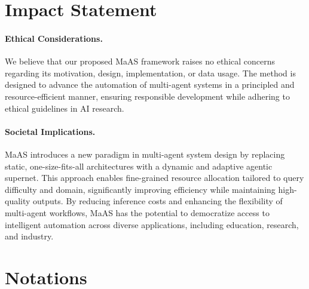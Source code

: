 \documentclass{article}
\theoremstyle{plain}
\theoremstyle{definition}
\theoremstyle{remark}
\newcommand{\ourmethod}{{{MaAS}}\xspace}
\begin{document}
\section*{Impact Statement}  

\paragraph{Ethical Considerations.}  
We believe that our proposed \ourmethod framework raises no ethical concerns regarding its motivation, design, implementation, or data usage. The method is designed to advance the automation of multi-agent systems in a principled and resource-efficient manner, ensuring responsible development while adhering to ethical guidelines in AI research.
\vspace{-0.5em}  
\paragraph{Societal Implications.}  
\ourmethod introduces a new paradigm in multi-agent system design by replacing static, one-size-fits-all architectures with a dynamic and adaptive agentic supernet. This approach enables fine-grained resource allocation tailored to query difficulty and domain, significantly improving efficiency while maintaining high-quality outputs. By reducing inference costs and enhancing the flexibility of multi-agent workflows, \ourmethod has the potential to democratize access to intelligent automation across diverse applications, including education, research, and industry. 






\newpage
\appendix
\onecolumn


\section{Notations}
\end{document}

